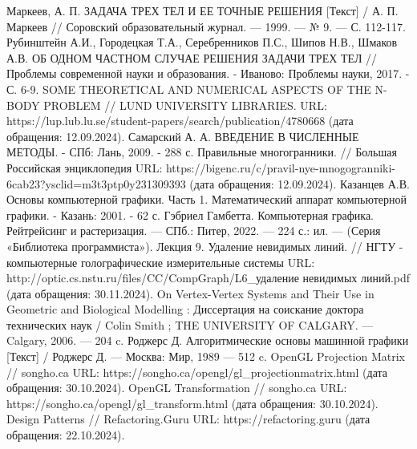 \begin{thebibliography}{}
	 Маркеев, А. П. ЗАДАЧА ТРЕХ ТЕЛ И ЕЕ ТОЧНЫЕ РЕШЕНИЯ [Текст] / А. П. Маркеев // Соровский образовательный журнал. — 1999. — № 9. — С. 112-117.
	 Рубинштейн А.И., Городецкая Т.А., Серебренников П.С., Шипов Н.В., Шмаков А.В. ОБ ОДНОМ ЧАСТНОМ СЛУЧАЕ РЕШЕНИЯ ЗАДАЧИ ТРЕХ ТЕЛ // Проблемы современной науки и образования. - Иваново: Проблемы науки, 2017. - С. 6-9.
	 SOME THEORETICAL AND NUMERICAL ASPECTS OF THE N-BODY PROBLEM // LUND UNIVERSITY LIBRARIES. URL: https://lup.lub.lu.se/student-papers/search/publication/4780668 (дата обращения: 12.09.2024).
	 Самарский А. А. ВВЕДЕНИЕ В ЧИСЛЕННЫЕ МЕТОДЫ. - СПб: Лань, 2009. - 288 с.
	 Правильные многогранники. // Большая Российская энциклопедия URL: https://bigenc.ru/c/pravil-nye-mnogogranniki-6cab23?ysclid=m3t3ptp0y231309393 (дата обращения: 12.09.2024).
	 Казанцев А.В. Основы компьютерной графики. Часть 1. Математический аппарат компьютерной графики. - Казань: 2001. - 62 с.
	 Гэбриел Гамбетта. Компьютерная графика. Рейтрейсинг и растеризация. — СПб.: Питер, 2022. — 224 с.: ил. — (Серия «Библиотека программиста»).
	 Лекция 9. Удаление невидимых линий. // НГТУ - компьютерные голографические измерительные системы URL: http://optic.cs.nstu.ru/files/CC/CompGraph/L6\_удаление невидимых линий.pdf (дата обращения: 30.11.2024).
	 On Vertex-Vertex Systems and Their Use in Geometric and Biological Modelling : Диссертация на соискание доктора технических наук / Colin Smith ; THE UNIVERSITY OF CALGARY. — Calgary, 2006. — 204 c.
	 Роджерс Д. Алгоритмические основы машинной графики [Текст] / Роджерс Д. — Москва: Мир, 1989 — 512 c.
	 OpenGL Projection Matrix // songho.ca URL: https://songho.ca/opengl/gl\_projectionmatrix.html (дата обращения: 30.10.2024).
	 OpenGL Transformation // songho.ca URL: https://songho.ca/opengl/gl\_transform.html (дата обращения: 30.10.2024).
	 Design Patterns // Refactoring.Guru URL: https://refactoring.guru (дата обращения: 22.10.2024).
\end{thebibliography}
